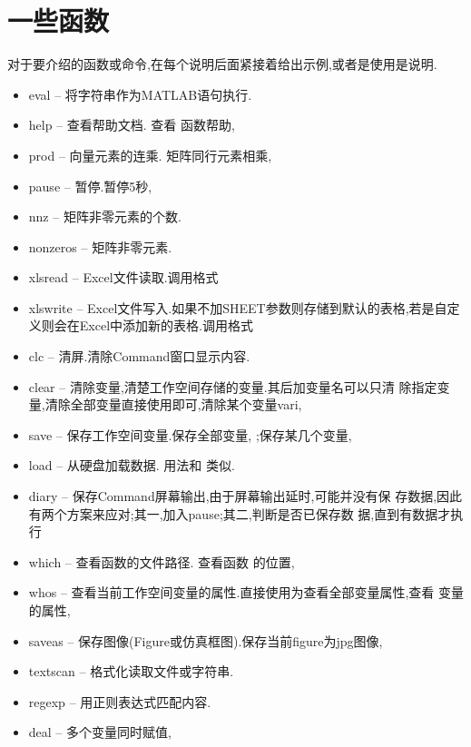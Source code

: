 \section{一些函数}
对于要介绍的函数或命令,在每个说明后面紧接着给出示例,或者是使用是说明.

\begin{itemize}
\item{eval} -- 将字符串作为MATLAB语句执行. 
\item{help} -- 查看帮助文档. 查看  函数帮助, 
\item{prod} -- 向量元素的连乘. 矩阵同行元素相乘, 
\item{pause} -- 暂停.暂停5秒, 
\item{nnz} -- 矩阵非零元素的个数. 
\item{nonzeros} -- 矩阵非零元素. 
\item{xlsread} -- Excel文件读取.调用格式 
\item{xlswrite} -- Excel文件写入.如果不加SHEET参数则存储到默认的表格,若是自定义则会在Excel中添加新的表格.调用格式 
\item{clc} -- 清屏.清除Command窗口显示内容. 
\item{clear} -- 清除变量,清楚工作空间存储的变量.其后加变量名可以只清
除指定变量,清除全部变量直接使用即可,清除某个变量vari, 
\item{save} -- 保存工作空间变量.保存全部变量, ;保存某几个变量,\\ 
\item{load} -- 从硬盘加载数据. 用法和  类似.
\item{diary} -- 保存Command屏幕输出,由于屏幕输出延时,可能并没有保
存数据,因此有两个方案来应对;其一,加入pause;其二,判断是否已保存数
据,直到有数据才执行 
\item{which} -- 查看函数的文件路径. 查看函数  的位置, 
\item{whos} -- 查看当前工作空间变量的属性.直接使用为查看全部变量属性,查看  变量的属性, 
\item{saveas} -- 保存图像(Figure或仿真框图).保存当前figure为jpg图像, \\ 
\item{textscan} -- 格式化读取文件或字符串.
\item{regexp} -- 用正则表达式匹配内容.
\item{deal} -- 多个变量同时赋值, \\ 
\end{itemize}